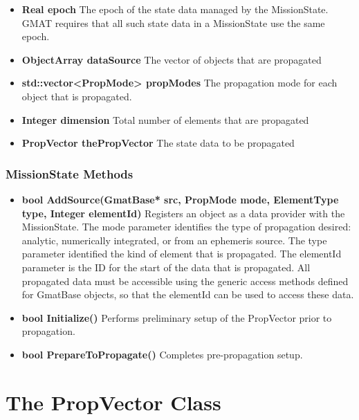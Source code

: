 \begin{itemize}
\item\textbf{Real epoch} The epoch of the state data managed by the MissionState.  GMAT requires
that all such state data in a MissionState use the same epoch.
\item\textbf{ObjectArray dataSource} The vector of objects that are propagated
\item\textbf{std::vector<PropMode> propModes} The propagation mode for each object that is
propagated.
\item\textbf{Integer dimension} Total number of elements that are propagated
\item\textbf{PropVector thePropVector} The state data to be propagated
\end{itemize}

\subsubsection{MissionState Methods}

\begin{itemize}
\item\textbf{bool AddSource(GmatBase* src, PropMode mode, ElementType type, Integer elementId)}
Registers an object as a data provider with the MissionState.  The mode parameter identifies the
type of propagation desired: analytic, numerically integrated, or from an ephemeris source.  The
type parameter identified the kind of element that is propagated.  The elementId parameter is the ID
for the start of the data that is propagated.  All propagated data must be accessible using the
generic access methods defined for GmatBase objects, so that the elementId can be used to access
these data.
\item\textbf{bool Initialize()}  Performs preliminary setup of the PropVector prior to propagation.
\item \textbf{bool PrepareToPropagate()}  Completes pre-propagation setup.
\end{itemize}

\section{\label{section:propVector}The PropVector Class}


